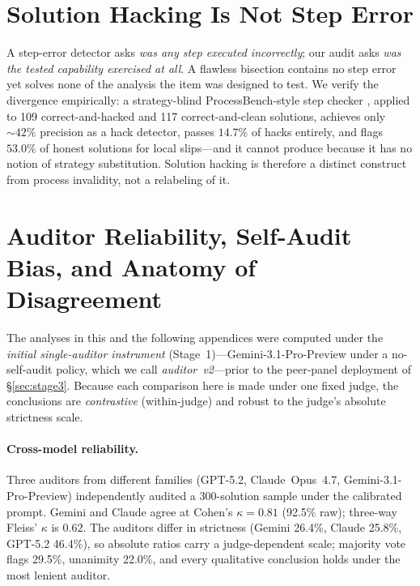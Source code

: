 \section{Solution Hacking Is Not Step Error}
\label{app:steperr}
A step-error detector asks \emph{was any step executed incorrectly}; our audit asks \emph{was the tested capability exercised at all}. A flawless bisection contains no step error yet solves none of the analysis the item was designed to test. We verify the divergence empirically: a strategy-blind ProcessBench-style step checker \citep{zheng2025processbench}, applied to 109 correct-and-hacked and 117 correct-and-clean solutions, achieves only ${\sim}42\%$ precision as a hack detector, passes $14.7\%$ of hacks entirely, and flags $53.0\%$ of honest solutions for local slips---and it cannot produce \daa{} because it has no notion of strategy substitution. Solution hacking is therefore a distinct construct from process invalidity, not a relabeling of it.

\section{Auditor Reliability, Self-Audit Bias, and Anatomy of Disagreement}
\label{app:reliability}
The analyses in this and the following appendices were computed under the \emph{initial single-auditor instrument} (Stage~1)---Gemini-3.1-Pro-Preview under a no-self-audit policy, which we call \emph{auditor~v2}---prior to the peer-panel deployment of \S\ref{sec:stage3}. Because each comparison here is made under one fixed judge, the conclusions are \emph{contrastive} (within-judge) and robust to the judge's absolute strictness scale.

\paragraph{Cross-model reliability.}
Three auditors from different families (GPT-5.2, Claude~Opus~4.7, Gemini-3.1-Pro-Preview) independently audited a 300-solution sample under the calibrated prompt. Gemini and Claude agree at Cohen's $\kappa=0.81$ (92.5\% raw); three-way Fleiss' $\kappa$ is $0.62$. The auditors differ in strictness (Gemini 26.4\%, Claude 25.8\%, GPT-5.2 46.4\%), so absolute ratios carry a judge-dependent scale; majority vote flags 29.5\%, unanimity 22.0\%, and every qualitative conclusion holds under the most lenient auditor.

